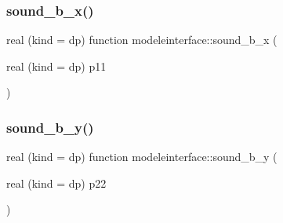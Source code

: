 \mbox{\label{namespacemodeleinterface_aa422a9d23665a7fa175a3458f15d6be2}} 
\subsubsection{\texorpdfstring{sound\+\_\+b\+\_\+x()}{sound\_b\_x()}}
{\footnotesize\ttfamily real (kind = dp) function modeleinterface\+::sound\+\_\+b\+\_\+x (\begin{DoxyParamCaption}\item[{real (kind = dp)}]{p11 }\end{DoxyParamCaption})}

\mbox{\label{namespacemodeleinterface_ae6539d207be975bdb5b8c45826062a30}} 
\subsubsection{\texorpdfstring{sound\+\_\+b\+\_\+y()}{sound\_b\_y()}}
{\footnotesize\ttfamily real (kind = dp) function modeleinterface\+::sound\+\_\+b\+\_\+y (\begin{DoxyParamCaption}\item[{real (kind = dp)}]{p22 }\end{DoxyParamCaption})}

